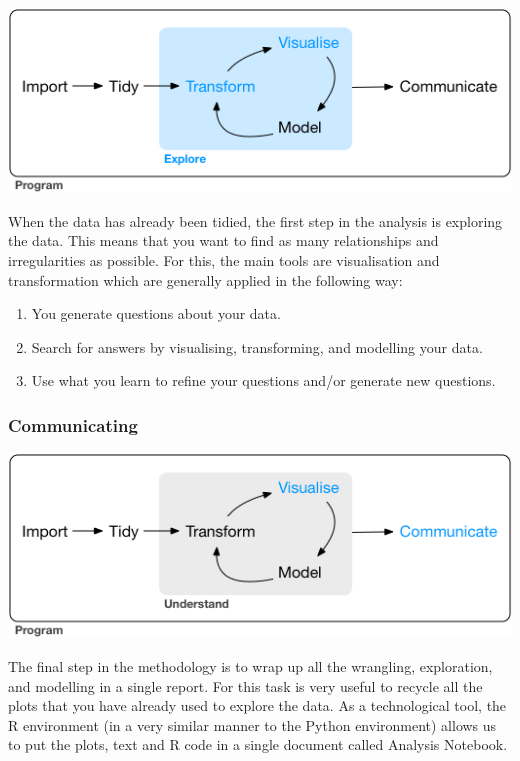 \documentclass[]{book}
\providecommand{\tightlist}{%
  \setlength{\itemsep}{0pt}\setlength{\parskip}{0pt}}
\begin{document}
\includegraphics[width=7.18in]{diagrams/data-science-explore}

When the data has already been tidied, the first step in the analysis is
exploring the data. This means that you want to find as many
relationships and irregularities as possible. For this, the main tools
are visualisation and transformation which are generally applied in the
following way:

\begin{enumerate}
\def\labelenumi{\arabic{enumi}.}
\tightlist
\item
  You generate questions about your data.
\item
  Search for answers by visualising, transforming, and modelling your
  data.
\item
  Use what you learn to refine your questions and/or generate new
  questions.
\end{enumerate}

\subsubsection{Communicating}\label{communicating}

\includegraphics[width=7.18in]{diagrams/data-science-communicate}

The final step in the methodology is to wrap up all the wrangling,
exploration, and modelling in a single report. For this task is very
useful to recycle all the plots that you have already used to explore
the data. As a technological tool, the R environment (in a very similar
manner to the Python environment) allows us to put the plots, text and R
code in a single document called Analysis Notebook.
\end{document}
